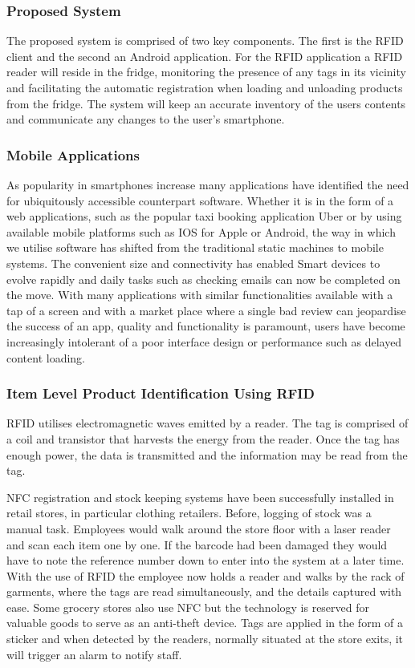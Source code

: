 \documentclass[a4paper, 11pt]{article}
\begin{document}
\subsubsection{Proposed System}
The proposed system is comprised of two key components. The first is the RFID client and the second an Android application. For the RFID application a RFID reader will reside in the fridge, monitoring the presence of any tags in its vicinity and facilitating the automatic registration when loading and unloading products from the fridge. The system will keep an accurate inventory of the users contents and communicate any changes to the user's smartphone.

\subsubsection{Mobile Applications}
As popularity in smartphones increase many applications have identified the need for ubiquitously accessible counterpart software. Whether it is in the form of a web applications, such as the popular taxi booking application Uber or by using available mobile platforms such as IOS for Apple or Android, the way in which we utilise software has shifted from the traditional static machines to mobile systems. The convenient size and connectivity has enabled Smart devices to evolve rapidly and daily tasks such as checking emails can now be completed on the move. With many applications with similar functionalities available with a tap of a screen and with a market place where a single bad review can jeopardise the success of an app, quality and functionality is paramount, users have become increasingly intolerant of a poor interface design or performance such as delayed content loading. 

\subsubsection{Item Level Product Identification Using RFID} 
RFID utilises electromagnetic waves emitted by a reader. The tag is comprised of a coil and transistor that harvests the energy from the reader. Once the tag has enough power, the data is transmitted and the information may be read from the tag. 

NFC registration and stock keeping systems have been successfully installed in retail stores, in particular clothing retailers. Before, logging of stock was a manual task. Employees would walk around the store floor with a laser reader and scan each item one by one. If the barcode had been damaged they would have to note the reference number down to enter into the system at a later time. With the use of RFID the employee now holds a reader and walks by the rack of garments, where the tags are read simultaneously, and the details captured with ease. Some grocery stores also use NFC but the technology is reserved for valuable goods to serve as an anti-theft device. Tags are applied in the form of a sticker and when detected by the readers, normally situated at the store exits, it will trigger an alarm to notify staff.
\end{document}
